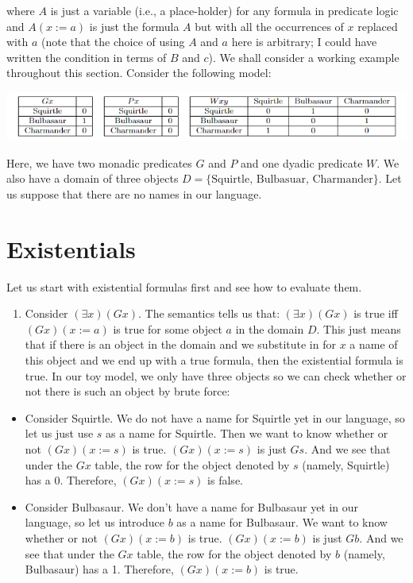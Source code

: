\documentclass[
]{book}
\providecommand{\tightlist}{%
  \setlength{\itemsep}{0pt}\setlength{\parskip}{0pt}}
\begin{document}
where \(A\) is just a variable (i.e., a place-holder) for any formula in predicate logic and \(A(x:=a)\) is just the formula \(A\) but with all the occurrences of \(x\) replaced with \(a\) (note that the choice of using \(A\) and \(a\) here is arbitrary; I could have written the condition in terms of \(B\) and \(c\)). We shall consider a working example throughout this section. Consider the following model:

\includegraphics{Pictures/Week9-1.png}

Here, we have two monadic predicates \(G\) and \(P\) and one dyadic predicate \(W\). We also have a domain of three objects \(D = \{\text{Squirtle, Bulbasuar, Charmander}\}\). Let us suppose that there are no names in our language.

\hypertarget{existentials}{%
\section{Existentials}\label{existentials}}

Let us start with existential formulas first and see how to evaluate them.

\begin{enumerate}
\def\labelenumi{\arabic{enumi}.}
\tightlist
\item
  Consider \((\exists x)(Gx)\). The semantics tells us that: \((\exists x)(Gx)\) is true iff \((Gx)(x:=a)\) is true for some object \(a\) in the domain \(D\). This just means that if there is an object in the domain and we substitute in for \(x\) a name of this object and we end up with a true formula, then the existential formula is true. In our toy model, we only have three objects so we can check whether or not there is such an object by brute force:
\end{enumerate}

\begin{itemize}
\tightlist
\item
  Consider Squirtle. We do not have a name for Squirtle yet in our language, so let us just use \(s\) as a name for Squirtle. Then we want to know whether or not \((Gx) (x := s)\) is true. \((Gx)(x:=s)\) is just \(Gs\). And we see that under the \(Gx\) table, the row for the object denoted by \(s\) (namely, Squirtle) has a \(0\). Therefore, \((Gx) (x:=s)\) is false.
\item
  Consider Bulbasaur. We don't have a name for Bulbasaur yet in our language, so let us introduce \(b\) as a name for Bulbasaur. We want to know whether or not \((Gx)(x:= b)\) is true. \((Gx)(x:=b)\) is just \(Gb\). And we see that under the \(Gx\) table, the row for the object denoted by \(b\) (namely, Bulbasaur) has a 1. Therefore, \((Gx)(x:=b)\) is true.
\end{itemize}
\end{document}
